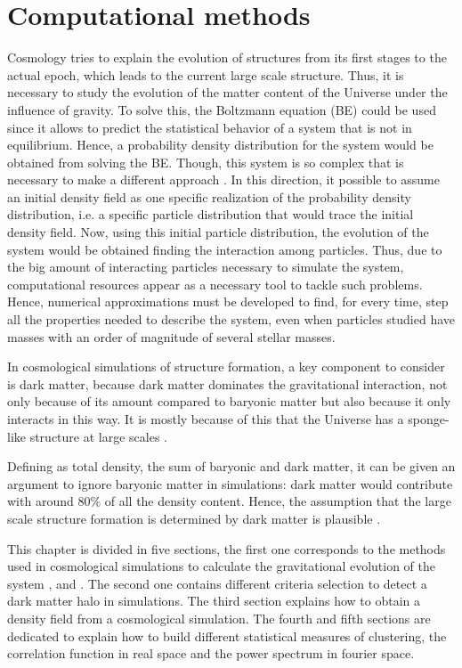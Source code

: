 \chapter{ Computational methods }
\label{chap3}


Cosmology tries to explain the evolution of structures 
from its first stages to the actual epoch, which leads to
the current large scale structure. 
Thus, it is necessary to study the evolution of the matter content 
of the Universe under the influence of gravity. To solve this,
the Boltzmann equation (BE) could be used since it allows to predict the statistical
behavior of a system that is not in equilibrium. Hence, a probability density 
distribution for the system would be obtained from solving the BE.
Though, this system is so complex that is necessary to make a different approach
\cite{bosch}. 
In this direction, it possible to assume an initial density field
as one specific realization of the probability density distribution, i.e. 
a specific particle distribution that would trace the initial density field. 
Now, using this initial particle distribution, the evolution of the system
would be obtained finding the interaction among particles.  
Thus, due to the big amount of interacting particles necessary to simulate
the system, computational resources appear as a necessary tool to tackle such problems. 
Hence, numerical approximations 
must be developed to find, for every time, step all the properties needed to describe 
the system, even when particles studied have masses with an order of magnitude of several 
stellar masses. 

In cosmological simulations of structure formation, a key component to consider
is dark matter, because dark matter dominates the gravitational
interaction, not only because of its amount compared to
baryonic matter but also because it only interacts in this way.
It is mostly because of this that the Universe has a sponge-like
structure at large scales \cite{kyplin1}. 

Defining as total density, the sum of baryonic and dark matter,
it can be given an argument to ignore baryonic matter in simulations: 
dark matter would contribute with around $80\%$ of all 
the density content. Hence, the assumption that the large scale
structure formation is determined by dark matter is plausible \cite{Longair}.

This chapter is divided in five sections, the first one
corresponds to the methods used in cosmological simulations to
calculate the gravitational evolution of the system \cite{Klypin1},\cite{Klypin2}
and \cite{Klypin3}. The second
one contains different criteria selection to detect a dark matter
halo in simulations. The third section explains how to obtain 
a density field from a cosmological simulation. The fourth and fifth 
sections are dedicated to explain how to build different statistical 
measures of clustering, the correlation function in real space and 
the power spectrum in fourier space.

